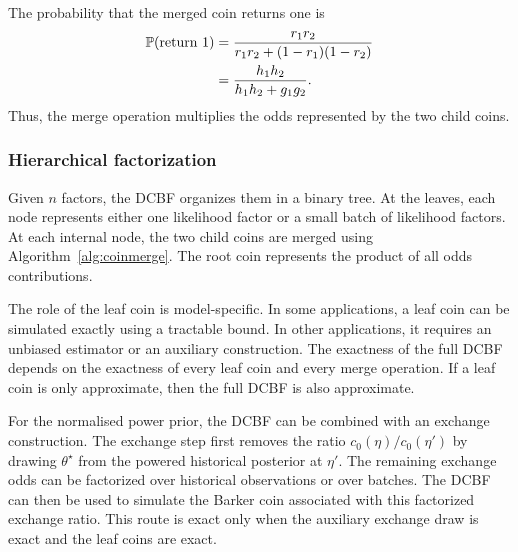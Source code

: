 The probability that the merged coin returns one is
\begin{align}
\mathbb{P}(\text{return }1)
&=
\frac{r_1r_2}
{r_1r_2+(1-r_1)(1-r_2)}
\\
&=
\frac{h_1h_2}
{h_1h_2+g_1g_2}.
\end{align}
Thus, the merge operation multiplies the odds represented by the two child coins.

\subsubsection{Hierarchical factorization}

Given $n$ factors, the DCBF organizes them in a binary tree.
At the leaves, each node represents either one likelihood factor or a small batch of likelihood factors.
At each internal node, the two child coins are merged using Algorithm~\ref{alg:coinmerge}.
The root coin represents the product of all odds contributions.

\begin{algorithm}[H]
    \caption{Divide-and-conquer Bernoulli factory}
    \label{alg:dcbf}
\end{algorithm}

The role of the leaf coin is model-specific.
In some applications, a leaf coin can be simulated exactly using a tractable bound.
In other applications, it requires an unbiased estimator or an auxiliary construction.
The exactness of the full DCBF depends on the exactness of every leaf coin and every merge operation.
If a leaf coin is only approximate, then the full DCBF is also approximate.

For the normalised power prior, the DCBF can be combined with an exchange construction.
The exchange step first removes the ratio $c_0(\eta)/c_0(\eta')$ by drawing $\theta^\star$ from the powered historical posterior at $\eta'$.
The remaining exchange odds can be factorized over historical observations or over batches.
The DCBF can then be used to simulate the Barker coin associated with this factorized exchange ratio.
This route is exact only when the auxiliary exchange draw is exact and the leaf coins are exact.

